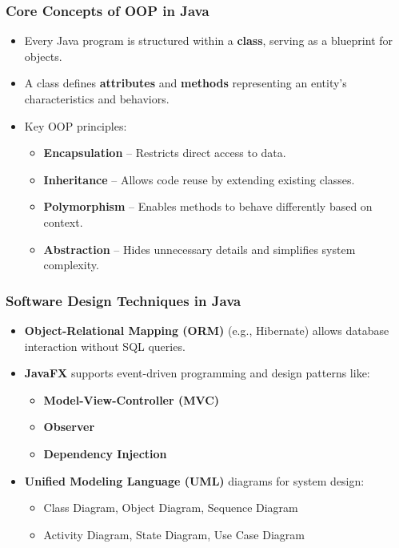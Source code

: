 \documentclass[aspectratio=169, table]{beamer}
\begin{document}
\begin{frame}[fragile]
	\frametitle{Core Concepts of OOP in Java}
	
	\begin{itemize}
		\item Every Java program is structured within a \textbf{class}, serving as a blueprint for objects.
		\item A class defines \textbf{attributes} and \textbf{methods} representing an entity’s characteristics and behaviors.
		\item Key OOP principles:
		\begin{itemize}
			\item \textbf{Encapsulation} – Restricts direct access to data.
			\item \textbf{Inheritance} – Allows code reuse by extending existing classes.
			\item \textbf{Polymorphism} – Enables methods to behave differently based on context.
			\item \textbf{Abstraction} – Hides unnecessary details and simplifies system complexity.
		\end{itemize}
	\end{itemize}
\end{frame}

\begin{frame}[fragile]
	\frametitle{Software Design Techniques in Java}
	
	\begin{itemize}
		\item \textbf{Object-Relational Mapping (ORM)} (e.g., Hibernate) allows database interaction without SQL queries.
		\item \textbf{JavaFX} supports event-driven programming and design patterns like:
		\begin{itemize}
			\item \textbf{Model-View-Controller (MVC)}
			\item \textbf{Observer}
			\item \textbf{Dependency Injection}
		\end{itemize}
		\item \textbf{Unified Modeling Language (UML)} diagrams for system design:
		\begin{itemize}
			\item Class Diagram, Object Diagram, Sequence Diagram
			\item Activity Diagram, State Diagram, Use Case Diagram
		\end{itemize}
	\end{itemize}
\end{frame}
\end{document}
